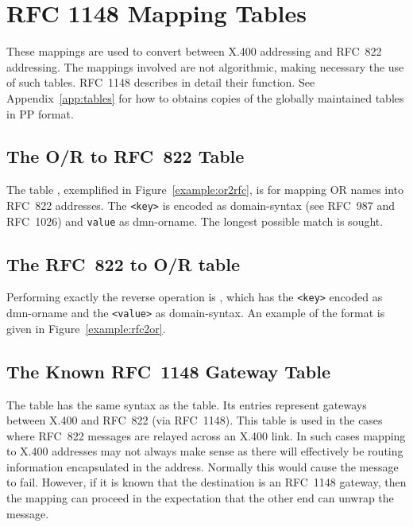 \section{RFC 1148 Mapping Tables}

These mappings are used to convert between X.400 addressing
and RFC~822 addressing. The mappings involved are not algorithmic,
making necessary the use of such tables.
RFC~1148 describes in detail their function.
See Appendix~\ref{app:tables} for how to obtains copies of the
globally maintained tables in PP format.

\subsection{The O/R to RFC~822 Table} 

The table , exemplified in Figure~\ref{example:or2rfc},
is for mapping OR names into RFC~822 addresses.  The \verb+<key>+ is
encoded as domain-syntax (see RFC~987 and RFC~1026) and
\verb+value+ as dmn-orname.  The longest possible match is sought.


\subsection{The RFC~822 to O/R table}
Performing exactly the reverse operation is
, which has the \verb+<key>+ encoded as
dmn-orname and the \verb+<value>+ as domain-syntax. An example of the
format is given in Figure~\ref{example:rfc2or}.


\subsection{The Known RFC~1148 Gateway Table}

The  table has the same syntax as the 
table.  Its entries represent gateways between X.400 and RFC~822 (via
RFC~1148). This table is used in the cases where RFC~822 messages are
relayed across an X.400 link. In such cases mapping to X.400 addresses
may not always make sense as there will effectively be routing
information encapsulated in the address. Normally this would cause the
message to fail. However, if it is known that the destination is an
RFC~1148 gateway, then the mapping can proceed in the expectation that
the other end can unwrap the message.

